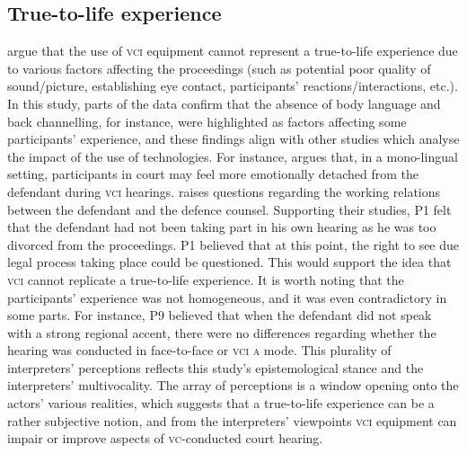 \documentclass[output=paper]{langsci/langscibook}
\begin{document}
\subsection{True-to-life experience}

 argue that the use of \textsc{vci} equipment cannot represent a true-to-life experience due to various factors affecting the proceedings (such as potential poor quality of sound/picture, establishing eye contact, participants’ reactions/interactions, etc.). In this study, parts of the data confirm that the absence of body language and back channelling, for instance, were highlighted as factors affecting some participants’ experience, and these findings align with other studies which analyse the impact of the use of technologies. For instance, \citet{Radburn-Remfry1994} argues that, in a mono-lingual setting, participants in court may feel more emotionally detached from the defendant during \textsc{vci} hearings. \citet{Hodges2008} raises questions regarding the working relations between the defendant and the defence counsel. Supporting their studies, P1 felt that the defendant had not been taking part in his own hearing as he was too divorced from the proceedings. P1 believed that at this point, the right to see due legal process taking place could be questioned. This would support the idea that \textsc{vci} cannot replicate a true-to-life experience. It is worth noting that the participants’ experience was not homogeneous, and it was even contradictory in some parts. For instance, P9 believed that when the defendant did not speak with a strong regional accent, there were no differences regarding whether the hearing was conducted in face-to-face or \textsc{vci a} mode. This plurality of interpreters’ perceptions reflects this study’s epistemological stance and the interpreters’ multivocality. The array of perceptions is a window opening onto the actors’ various realities, which suggests that a true-to-life experience can be a rather subjective notion, and from the interpreters’ viewpoints \textsc{vci} equipment can impair or improve aspects of \textsc{vc}-conducted court hearing.
\end{document}
